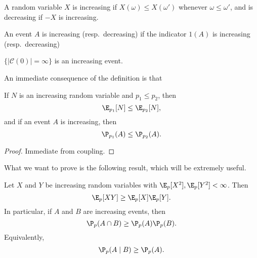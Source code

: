 \documentclass[a4paper]{article}
\begin{document}
\begin{defi}
  A random variable $X$ is increasing if $X(\omega) \leq X(\omega')$ whenever $\omega \leq \omega'$, and is decreasing if $-X$ is increasing.
\end{defi}

\begin{defi}
  An event $A$ is increasing (resp.\ decreasing) if the indicator $1(A)$ is increasing (resp.\ decreasing)
\end{defi}

\begin{eg}
  $\{|\mathcal{C}(0)|= \infty\}$ is an increasing event.
\end{eg}

An immediate consequence of the definition is that
\begin{thm}
  If $N$ is an increasing random variable and $p_1 \leq p_2$, then
  \[
    \E_{p_1} [N] \leq \E_{p_2} [N],
  \]
  and if an event $A$ is increasing, then
  \[
    \P_{p_1}(A) \leq \P_{p_2}(A).
  \]
\end{thm}

\begin{proof}
  Immediate from coupling.
\end{proof}

What we want to prove is the following result, which will be extremely useful.
\begin{thm}
  Let $X$ and $Y$ be increasing random variables with $\E_p[X^2], \E_p[Y^2] < \infty$. Then
  \[
    \E_p[XY] \geq \E_p[X] \E_p[Y].
  \]
  In particular, if $A$ and $B$ are increasing events, then
  \[
    \P_p(A \cap B) \geq \P_p(A) \P_p(B).
  \]
  Equivalently,
  \[
    \P_p(A \mid B) \geq \P_p(A).
  \]
\end{thm}
\end{document}
